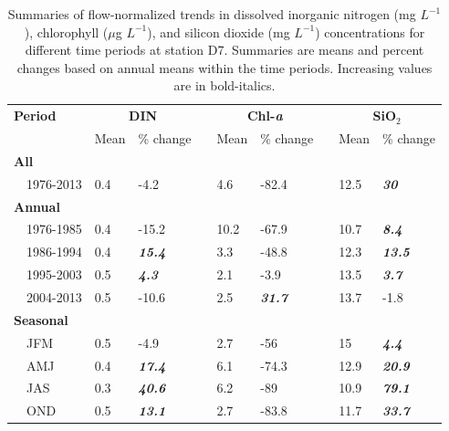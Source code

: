 \documentclass[letterpaper,12pt,oneside]{article}\usepackage[]{graphicx}\usepackage[]{color}
\begin{document}
\begin{table}[!tbp]
\caption{Summaries of flow-normalized trends in dissolved inorganic nitrogen (mg $L^{-1}$), chlorophyll ($\mu$g $L^{-1}$), and silicon dioxide (mg $L^{-1}$) concentrations for different time periods at station D7. Summaries are means and percent changes based on annual means within the time periods.  Increasing values are in bold-italics.\label{tab:d7chg}} 
\begin{center}
\begin{tabular}{lllcllcll}
\hline\hline
\multicolumn{1}{l}{\bfseries Period}&\multicolumn{2}{c}{\bfseries DIN}&\multicolumn{1}{c}{\bfseries }&\multicolumn{2}{c}{\bfseries Chl-\textit{a}}&\multicolumn{1}{c}{\bfseries }&\multicolumn{2}{c}{\bfseries SiO$_2$}\tabularnewline
\cline{2-3} \cline{5-6} \cline{8-9}
\multicolumn{1}{l}{}&\multicolumn{1}{c}{Mean}&\multicolumn{1}{c}{\% change}&\multicolumn{1}{c}{}&\multicolumn{1}{c}{Mean}&\multicolumn{1}{c}{\% change}&\multicolumn{1}{c}{}&\multicolumn{1}{c}{Mean}&\multicolumn{1}{c}{\% change}\tabularnewline
\hline
{\bfseries All}&&&&&&&&\tabularnewline
~~1976-2013&0.4&-4.2&&4.6&-82.4&&12.5&\textit{\textbf{30}}\tabularnewline
\hline
{\bfseries Annual}&&&&&&&&\tabularnewline
~~1976-1985&0.4&-15.2&&10.2&-67.9&&10.7&\textit{\textbf{8.4}}\tabularnewline
~~1986-1994&0.4&\textit{\textbf{15.4}}&&3.3&-48.8&&12.3&\textit{\textbf{13.5}}\tabularnewline
~~1995-2003&0.5&\textit{\textbf{4.3}}&&2.1&-3.9&&13.5&\textit{\textbf{3.7}}\tabularnewline
~~2004-2013&0.5&-10.6&&2.5&\textit{\textbf{31.7}}&&13.7&-1.8\tabularnewline
\hline
{\bfseries Seasonal}&&&&&&&&\tabularnewline
~~JFM&0.5&-4.9&&2.7&-56&&15&\textit{\textbf{4.4}}\tabularnewline
~~AMJ&0.4&\textit{\textbf{17.4}}&&6.1&-74.3&&12.9&\textit{\textbf{20.9}}\tabularnewline
~~JAS&0.3&\textit{\textbf{40.6}}&&6.2&-89&&10.9&\textit{\textbf{79.1}}\tabularnewline
~~OND&0.5&\textit{\textbf{13.1}}&&2.7&-83.8&&11.7&\textit{\textbf{33.7}}\tabularnewline
\hline
\end{tabular}\end{center}

\end{table}
\end{document}
